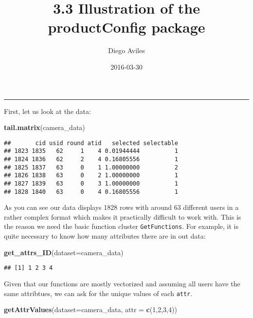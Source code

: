 \documentclass[]{article}
\title{3.3 Illustration of the productConfig package}
\author{Diego Aviles}
\date{2016-03-30}
\newenvironment{Shaded}{\begin{snugshade}}{\end{snugshade}}
\newcommand{\KeywordTok}[1]{\textcolor[rgb]{0.13,0.29,0.53}{\textbf{{#1}}}}
\newcommand{\DataTypeTok}[1]{\textcolor[rgb]{0.13,0.29,0.53}{{#1}}}
\newcommand{\DecValTok}[1]{\textcolor[rgb]{0.00,0.00,0.81}{{#1}}}
\newcommand{\NormalTok}[1]{{#1}}
\begin{document}
\maketitle


\begin{center}\rule{0.5\linewidth}{\linethickness}\end{center}

First, let us look at the data:

\begin{Shaded}
\begin{Highlighting}[]
\KeywordTok{tail.matrix}\NormalTok{(camera_data)}
\end{Highlighting}
\end{Shaded}

\begin{verbatim}
##       cid usid round atid   selected selectable
## 1823 1835   62     1    4 0.01944444          1
## 1824 1836   62     2    4 0.16805556          1
## 1825 1837   63     0    1 1.00000000          2
## 1826 1838   63     0    2 1.00000000          1
## 1827 1839   63     0    3 1.00000000          1
## 1828 1840   63     0    4 0.16805556          1
\end{verbatim}

As you can see our data displays 1828 rows with around 63 different
users in a rather complex format which makes it practically difficult to
work with. This is the reason we need the basic function cluster
\texttt{GetFunctions}. For example, it is quite necessary to know how
many attributes there are in out data:

\begin{Shaded}
\begin{Highlighting}[]
\KeywordTok{get_attrs_ID}\NormalTok{(}\DataTypeTok{dataset=}\NormalTok{camera_data)}
\end{Highlighting}
\end{Shaded}

\begin{verbatim}
## [1] 1 2 3 4
\end{verbatim}

Given that our functions are mostly vectorized and assuming all users
have the same attribtues, we can ask for the unique values of each
\texttt{attr}.

\begin{Shaded}
\begin{Highlighting}[]
\KeywordTok{getAttrValues}\NormalTok{(}\DataTypeTok{dataset=}\NormalTok{camera_data, }\DataTypeTok{attr =} \KeywordTok{c}\NormalTok{(}\DecValTok{1}\NormalTok{,}\DecValTok{2}\NormalTok{,}\DecValTok{3}\NormalTok{,}\DecValTok{4}\NormalTok{))}
\end{Highlighting}
\end{Shaded}
\end{document}
